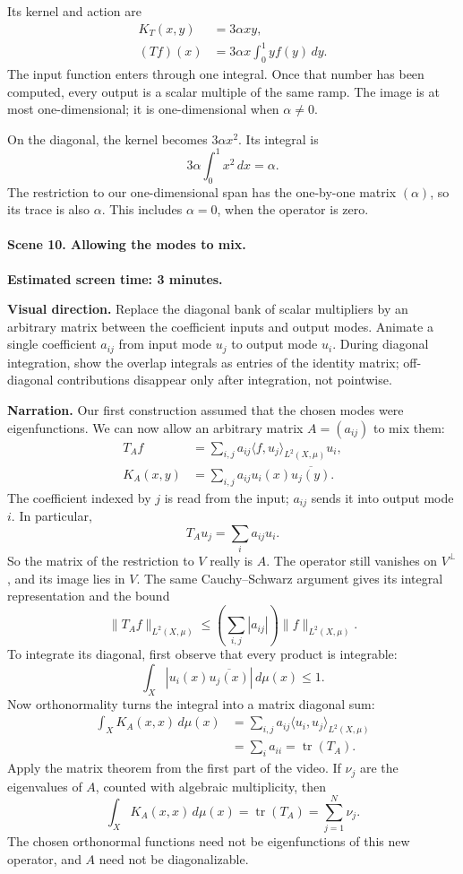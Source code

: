 Its kernel and action are
\[
\begin{aligned}
K_T(x,y)&=3\alpha xy,\\
(Tf)(x)&=3\alpha x\int_0^1yf(y)\,dy.
\end{aligned}
\]
The input function enters through one integral. Once that number has been computed, every output is a scalar multiple of the same ramp. The image is at most one-dimensional; it is one-dimensional when $\alpha\ne0$.

On the diagonal, the kernel becomes $3\alpha x^2$. Its integral is
\[
3\alpha\int_0^1x^2\,dx=\alpha.
\]
The restriction to our one-dimensional span has the one-by-one matrix $(\alpha)$, so its trace is also $\alpha$. This includes $\alpha=0$, when the operator is zero.

\paragraph{Scene 10. Allowing the modes to mix.}
\textbf{Estimated screen time: 3 minutes.}

\textbf{Visual direction.} Replace the diagonal bank of scalar multipliers by an arbitrary matrix between the coefficient inputs and output modes. Animate a single coefficient $a_{ij}$ from input mode $u_j$ to output mode $u_i$. During diagonal integration, show the overlap integrals as entries of the identity matrix; off-diagonal contributions disappear only after integration, not pointwise.

\textbf{Narration.} Our first construction assumed that the chosen modes were eigenfunctions. We can now allow an arbitrary matrix $A=(a_{ij})$ to mix them:
\[
\begin{aligned}
T_Af&=\sum_{i,j}a_{ij}\langle f,u_j\rangle_{L^2(X,\mu)}u_i,\\
K_A(x,y)&=\sum_{i,j}a_{ij}u_i(x)\overline{u_j(y)}.
\end{aligned}
\]
The coefficient indexed by $j$ is read from the input; $a_{ij}$ sends it into output mode $i$. In particular,
\[
T_Au_j=\sum_i a_{ij}u_i.
\]
So the matrix of the restriction to $V$ really is $A$. The operator still vanishes on $V^\perp$, and its image lies in $V$. The same Cauchy--Schwarz argument gives its integral representation and the bound
\[
\|T_Af\|_{L^2(X,\mu)}
\leq\left(\sum_{i,j}|a_{ij}|\right)\|f\|_{L^2(X,\mu)}.
\]
To integrate its diagonal, first observe that every product is integrable:
\[
\int_X|u_i(x)\overline{u_j(x)}|\,d\mu(x)\leq1.
\]
Now orthonormality turns the integral into a matrix diagonal sum:
\[
\begin{aligned}
\int_X K_A(x,x)\,d\mu(x)
&=\sum_{i,j}a_{ij}\langle u_i,u_j\rangle_{L^2(X,\mu)}\\
&=\sum_i a_{ii}=\operatorname{tr}(T_A).
\end{aligned}
\]
Apply the matrix theorem from the first part of the video. If $\nu_j$ are the eigenvalues of $A$, counted with algebraic multiplicity, then
\[
\boxed{\int_X K_A(x,x)\,d\mu(x)
=\operatorname{tr}(T_A)=\sum_{j=1}^N\nu_j.}
\]
The chosen orthonormal functions need not be eigenfunctions of this new operator, and $A$ need not be diagonalizable.

